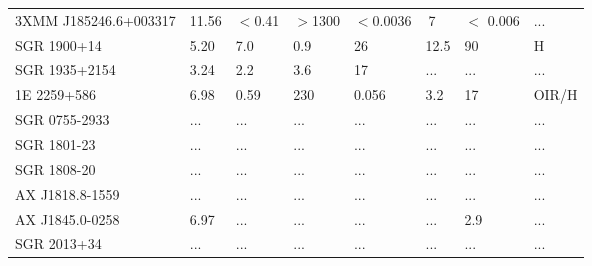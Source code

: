 \documentclass{standalone}
\begin{document}
\begin{tabular}{l|l|l|l|l|l|l|l}
3XMM J185246.6+003317 	& 11.56	& $<$0.41 & $>$1300 & $<$0.0036 	&$~$7 	&$<$ 0.006 	&...\\
SGR 1900+14 			& 5.20 	& 7.0	& 0.9	& 26		& 12.5	& 90		& H\\
SGR 1935+2154 			& 3.24 	& 2.2	& 3.6 	& 17		& ...	& ... 		&...\\
1E 2259+586 			& 6.98 	& 0.59	& 230 	&0.056		& 3.2	& 17		& OIR/H\\
SGR 0755-2933 			& ... 	& ... 	&...	& ...		& ...	& ...		& ...\\
SGR 1801-23 			& ... 	& ... 	&...	& ...		& ...	& ...		& ...\\
SGR 1808-20 			& ... 	& ...	& ...	& ...		& ...	& ...		& ...\\
AX J1818.8-1559 		& ... 	& ...	& ... 	&...		& ...	& ... 		&...\\
AX J1845.0-0258 		& 6.97 	& ...	& ...	& ...		& ... 	&2.9		& ...\\
SGR 2013+34 			& ... 	& ...	& ... 	&...		& ... 	&... 		&...
\end{tabular}
\end{document}
